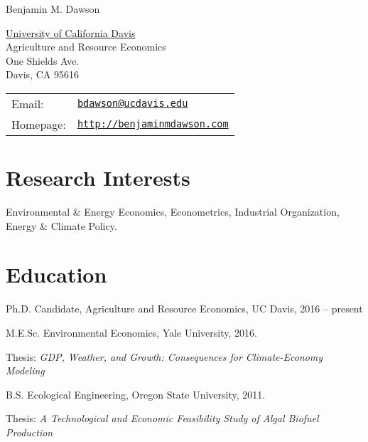 \documentclass[letterpaper]{article}
\def\name{Benjamin M. Dawson}
\renewenvironment{itemize}{
  \begin{list}{}{
    \setlength{\leftmargin}{1.5em}
  }
}{
  \end{list}
}
\begin{document}
{\huge \name}


\vspace{0.25in}

\begin{minipage}{0.45\linewidth}
  \href{http://are.ucdavis.edu/en/}{University of California Davis} \\
  Agriculture and Resource Economics \\
 One Shields Ave. \\
 Davis, CA 95616\\
 
\end{minipage}
\begin{minipage}{0.45\linewidth}
  \begin{tabular}{ll}
    Email: & \href{mailto:@ucdavis.edu}{\tt bdawson@ucdavis.edu} \\
    Homepage: & \href{http://benjaminmdawson.com}{\tt http://benjaminmdawson.com} \\
  \end{tabular}
\end{minipage}

\section*{Research Interests}
\begin{itemize}
\item Environmental \& Energy Economics, Econometrics, Industrial Organization, Energy \& Climate Policy.
\end{itemize} 

\section*{Education}

\begin{itemize}
  \item Ph.D. Candidate, Agriculture and Resource Economics, UC Davis, 2016 -- present
  \item M.E.Sc. Environmental Economics, Yale University, 2016.
  
  \leftskip 0.5in
 \parindent -0.5in
  \subitem Thesis: \emph{GDP, Weather, and Growth: Consequences for Climate-Economy Modeling}
  
  \leftskip 0.0in
  \item B.S. Ecological Engineering, Oregon State University, 2011.
  
  \leftskip 0.5in
 \parindent -0.5in
  \subitem Thesis: \emph{A Technological and Economic Feasibility Study of Algal Biofuel Production}
\end{itemize}
\end{document}
